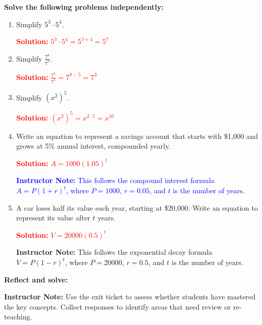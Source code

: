\documentclass[12pt]{article}
\begin{document}
\vspace{1em}

\begin{tcolorbox}[colframe=black!60, colback=white, 
coltitle=black, colbacktitle=black!15, fonttitle=\bfseries\Large, 
title=Independent Practice (Instructor Version), halign title=center, left=10pt, right=10pt, top=10pt, bottom=5pt]
\textbf{Solve the following problems independently:}
\begin{enumerate}[itemsep=1em]
    \item Simplify $ 5^3 \cdot 5^4 $.
    
    \textcolor{red}{\textbf{Solution:}}
    \textcolor{red}{$ 5^3 \cdot 5^4 = 5^{3+4} = 5^7 $}
    
    \item Simplify $ \frac{7^8}{7^5} $.
    
    \textcolor{red}{\textbf{Solution:}}
    \textcolor{red}{$ \frac{7^8}{7^5} = 7^{8-5} = 7^3 $}
    
    \item Simplify $ (x^2)^5 $.
    
    \textcolor{red}{\textbf{Solution:}}
    \textcolor{red}{$ (x^2)^5 = x^{2\cdot5} = x^{10} $}
    
    \item Write an equation to represent a savings account that starts with \$1,000 and grows at 5\% annual interest, compounded yearly.
    
    \textcolor{red}{\textbf{Solution:}}
    \textcolor{red}{$ A = 1000(1.05)^t $}
    
        \textcolor{blue}{\textbf{Instructor Note:} This follows the compound interest formula $ A = P(1 + r)^t $, where $ P = 1000 $, $ r = 0.05 $, and $ t $ is the number of years.}
    
    \item A car loses half its value each year, starting at \$20,000. Write an equation to represent its value after $t$ years.
    
    \textcolor{red}{\textbf{Solution:}}
    \textcolor{red}{$ V = 20000(0.5)^t $}
    
    \textbf{Instructor Note:} This follows the exponential decay formula $ V = P(1 - r)^t $, where $ P = 20000 $, $ r = 0.5 $, and $ t $ is the number of years.
\end{enumerate}
\end{tcolorbox}


\vspace{1em}

\begin{tcolorbox}[colframe=black!60, colback=white, 
coltitle=black, colbacktitle=black!15, fonttitle=\bfseries\Large, 
title=Exit Ticket, halign title=center, left=10pt, right=10pt, top=10pt, bottom=15pt]
\textbf{Reflect and solve:}

{\color{blue} \textbf{Instructor Note:} Use the exit ticket to assess whether students have mastered the key concepts. Collect responses to identify areas that need review or re-teaching.}
\end{tcolorbox}
\end{document}

